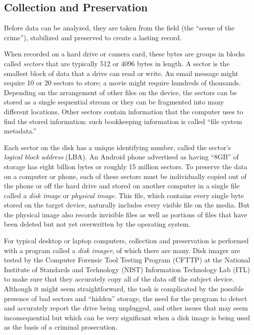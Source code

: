 \documentclass[11pt,letter]{article}
\begin{document}
\subsection{Collection and Preservation} 
Before data can be analyzed, they
  are taken from the field (the ``scene of the crime''),
  stabilized and preserved to create a lasting record. 

When recorded on a hard drive or camera card, these bytes are groups in
  blocks called \emph{sectors} that are typically 512 or 4096 bytes in
  length. A sector is the smallest block of data that a drive can read
  or write. An email message might require 10 or 20 sectors to
  store; a movie might require hundreds of thousands. Depending on the
  arrangement of other files on the device, the sectors can be stored
  as a single sequential stream or they can be fragmented into many
  different locations. Other sectors contain information that the
  computer uses to find the stored information: such bookkeeping
  information is called ``file system metadata.''

  Each sector on the disk has a unique identifying number, called
  the sector's \emph{logical block address} (LBA). An Android phone
  advertised as having ``8GB'' of storage has eight billion bytes or roughly 15
  million sectors.  To preserve the data on a computer or phone, each of these sectors
  must be individually copied out of the phone or off the hard drive and
  stored on another computer in a single file called a \emph{disk image}
  or \emph{physical image}. This file, which contains every single byte
  stored on the target device, naturally includes every
  visible file on the media. But the physical image also records
  invisible files as well as portions of files that have been deleted
  but not yet overwritten by the operating system. 

  For typical desktop or laptop computers, collection and preservation
  is performed with a program called a \emph{disk imager}, of which there
  are many. Disk imager  are tested by the Computer Forensic
  Tool Testing Program (CFTTP) at the National Institute of Standards and
  Technology (NIST) Information Technology Lab (ITL) to make sure that
  they accurately copy all of the data off the subject
  device. Although it might seem straightforward, the task is
  complicated by the possible presence of bad sectors and ``hidden''
  storage, the need for the program to detect and accurately report
  the drive being unplugged, and other issues that may seem
  inconsequential but which can be very significant when a disk image
  is being used as the basis of a criminal prosecution. 
\end{document}
